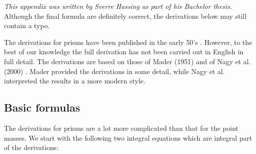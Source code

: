 
{\sl This appendix was written by Sverre Hassing as part of his Bachelor thesis.} 
Although the final formula are definitely correct, the derivations below may still contain a typo. 

\vspace{.4cm}

The derivations for prisms have been published in the early 50's \cite{made51}. 
However, to the best of our knowledge the full derivation has not been carried out in English in full detail. 
The derivations are based on those of Mader (1951) \cite{made51} and of Nagy et al. (2000) \cite{napb00,napb02}. 
Mader provided the derivations in some detail, while Nagy et al. interpreted the results in a more modern style. 


\subsection{Basic formulas}

The derivations for prisms are a lot more complicated than that for the point masses. 
We start with the following two integral equations which are integral part of the derivations:

